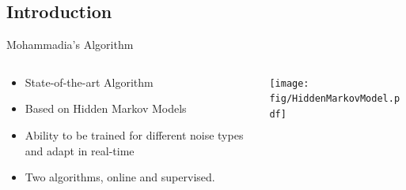 \subsection{Introduction}
\begin{frame}{Mohammadia's Algorithm}
	\begin{columns}[c]
	\begin{column}{0.5\textwidth}
		\begin{itemize}
			\item State-of-the-art Algorithm
			\item Based on Hidden Markov Models
			\item Ability to be trained for different noise types and adapt in real-time 
			\item Two algorithms, online and supervised.
		\end{itemize}
	\end{column}
	\begin{column}{0.5\textwidth}
		\centering
		\texttt{[image: fig/HiddenMarkovModel.pdf]}
	\end{column}
	\end{columns}
\end{frame}


